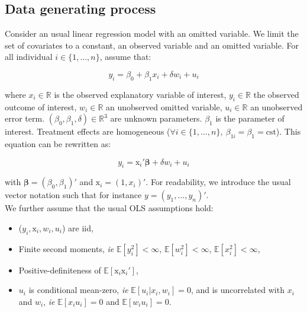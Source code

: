 \documentclass[a4paper, 11pt]{report}
\begin{document}
		\subsection{Data generating process}\label{maths_dgp}
		
			Consider an usual linear regression model with an omitted variable. We limit the set of covariates to a constant, an observed variable and an omitted variable. For all individual $i \in \{1, ..., n\}$, assume that: 
			
				\begin{equation}\label{maths_true_dgp}
					y_i = \beta_{0} + \beta_{1}x_{i} + \delta w_{i} + u_i
				\end{equation}
				
				where $x_i \in \mathbb{R}$ is the observed explanatory variable of interest, $y_i \in \mathbb{R}$ the observed outcome of interest, $w_i \in \mathbb{R}$ an unobserved omitted variable, $u_i \in \mathbb{R}$ an unobserved error term.  $(\beta_0, \beta_1, \delta) \in \mathbb{R}^{3}$ are unknown parameters. $\beta_1$ is the parameter of interest. Treatment effects are homogeneous ($\forall i \in \{1, ..., n\}, \ \beta_{1i} = \beta_{1} = \text{cst}$). This equation can be rewritten as:
				
				\[
					y_i = \text{x}_{i}'\bm{\beta} + \delta w_{i} + u_i
				\]
				
				with $\bm{\beta} = (\beta_0, \beta_1)'$ and $\text{x}_i = (1, x_i)'$. For readability, we introduce the usual vector notation such that for instance $y = (y_1, ..., y_n)'$. \\
			
			We further assume that the usual OLS assumptions hold: 
			
				\begin{itemize}
					\item ($y_i, \text{x}_i, w_{i}, u_{i}$) are iid, 
					\item Finite second moments, \textit{ie} $\mathbb{E}[y_{i}^{2}] < \infty$, $\mathbb{E}[w_{i}^{2}] < \infty$, $\mathbb{E}[x_{i}^{2}] < \infty$, 
					\item Positive-definiteness of $\mathbb{E}[\text{x}_i \text{x}_i']$, 
					\item $u_{i}$ is conditional mean-zero, \textit{ie} $\mathbb{E}[u_{i} | x_{i}, w_{i}] = 0$, and is uncorrelated with $x_i$ and $w_i$, \textit{ie} $\mathbb{E}[x_{i}u_{i}] = 0$ and $\mathbb{E}[w_{i}u_{i}] = 0$. \\
				\end{itemize}
				
\end{document}

